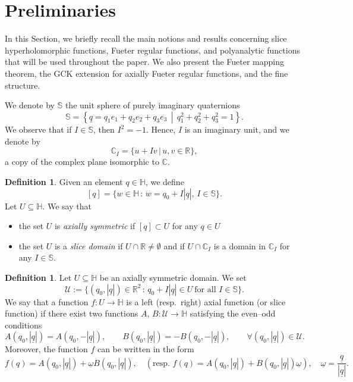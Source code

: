 \documentclass[reqno,11pt]{amsart}
\numberwithin{equation}{section}
\theoremstyle{definition}
\newtheorem{definition}[theorem]{Definition}
\begin{document}
\section{Preliminaries}

In this Section, we briefly recall the main notions and results concerning slice hyperholomorphic functions, Fueter regular functions, and polyanalytic functions that will be used throughout the paper. We also present the Fueter mapping theorem, the GCK extension for axially Fueter regular functions, and the fine structure.

\medskip

We denote by $\mathbb{S}$ the unit sphere of purely imaginary quaternions
$$
\mathbb{S} = \left\{ \underline{q} = q_1 e_1 + q_2 e_2 + q_3 e_3 \,\middle|\, q_1^2 + q_2^2 + q_3^2 = 1 \right\}.
$$
We observe that if $I \in \mathbb{S}$, then $I^2 = -1$. Hence, $I$ is an imaginary unit, and we denote by
$$
\mathbb{C}_I = \{ u + I v \,|\, u, v \in \mathbb{R} \},
$$
a copy of the complex plane isomorphic to $\mathbb{C}$.

\begin{definition}
Given an element $q \in \mathbb{H}$, we define
$$ [q]= \{w \in \mathbb{H} \, : \, w=q_0+I | \underline{q}|, \, I \in \mathbb{S}\}.$$
Let $ U \subseteq \mathbb{H}$. We say that
\begin{itemize}
\item the set $U$ is \emph{axially symmetric} if $[q] \subset U$ for any $q \in U$
\item the set $U$ is a \emph{slice domain} if $U \cap \mathbb{R} \neq \emptyset$ and if $U \cap \mathbb{C}_I$ is a domain in $\mathbb{C}_I$ for any $I \in \mathbb{S}$.
\end{itemize}
\end{definition}


\begin{definition}
\label{axial1}
	Let $U \subseteq \mathbb{H}$ be an axially symmetric domain. We set
\begin{equation}
\label{set}
	\mathcal{U}:=\{(q_0, |\underline{q}|) \in \mathbb{R}^2 \, : \, q_0+I|\underline{q}| \in U \ \text{for all } I \in \mathbb{S}\}.
\end{equation}
	We say that a function $f:U \to \mathbb{H}$ is a left (resp.\ right) axial function (or slice function) if there exist two functions $A$, $B: \mathcal{U} \to \mathbb{H}$ satisfying the even--odd conditions
	\begin{equation}
		\label{eo}
		A(q_0, |\underline{q}|)=A(q_0,-|\underline{q}|), \qquad
		B(q_0, |\underline{q}|)=-B(q_0,- |\underline{q}|),
		\qquad \forall (q_0, |\underline{q}|) \in \mathcal{U}.
	\end{equation}
	Moreover, the function $f$ can be written in the form
	\begin{equation}
		f(q)=A(q_0,|\underline{q}|)+\underline{\omega}B(q_0, |\underline{q}|),
		\quad
		\left( \text{resp. } f(q)=A(q_0, |\underline{q}|)+B(q_0, |\underline{q}|)\underline{\omega}\right),
		\quad
		\underline{\omega}=\frac{\underline{q}}{|\underline{q}|}.
	\end{equation}
\end{definition}
\end{document}
